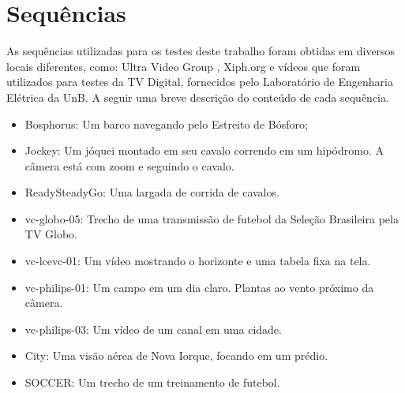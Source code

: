 \newpage
\section{Sequências}

As sequências utilizadas para os testes deste trabalho foram obtidas em diversos locais diferentes,
como: Ultra Video Group \cite{uvg_dataset}, Xiph.org \cite{xiph} e vídeos que foram utilizados para
testes da TV Digital, fornecidos pelo Laboratório de Engenharia Elétrica da UnB. A seguir uma breve
descrição do conteúdo de cada sequência.

\begin{itemize}
    \item Bosphorus: Um barco navegando pelo Estreito de Bósforo;
    \item Jockey: Um jóquei montado em seu cavalo correndo em um hipódromo. A câmera está com zoom e 
    seguindo o cavalo.
    \item ReadySteadyGo: Uma largada de corrida de cavalos.
    \item vc-globo-05: Trecho de uma transmissão de futebol da Seleção Brasileira pela TV Globo.
    \item vc-lcevc-01: Um vídeo mostrando o horizonte e uma tabela fixa na tela.
    \item vc-philips-01: Um campo em um dia claro. Plantas ao vento próximo da câmera.
    \item vc-philips-03: Um vídeo de um canal em uma cidade.
    \item City: Uma visão aérea de Nova Iorque, focando em um prédio.
    \item SOCCER: Um trecho de um treinamento de futebol.
\end{itemize}

